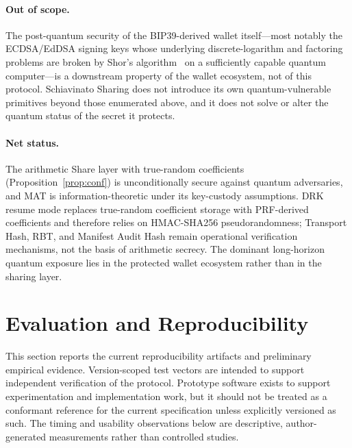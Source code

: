 \documentclass[11pt]{article}
\begin{document}
\paragraph{Out of scope.} The post-quantum security of the BIP39-derived wallet itself---most notably the ECDSA/EdDSA signing keys whose underlying discrete-logarithm and factoring problems are broken by Shor's algorithm~\cite{shor1994} on a sufficiently capable quantum computer---is a downstream property of the wallet ecosystem, not of this protocol. Schiavinato Sharing does not introduce its own quantum-vulnerable primitives beyond those enumerated above, and it does not solve or alter the quantum status of the secret it protects.

\paragraph{Net status.} The arithmetic Share layer with true-random coefficients (Proposition~\ref{prop:conf}) is unconditionally secure against quantum adversaries, and MAT is information-theoretic under its key-custody assumptions. DRK resume mode replaces true-random coefficient storage with PRF-derived coefficients and therefore relies on HMAC-SHA256 pseudorandomness; Transport Hash, RBT, and Manifest Audit Hash remain operational verification mechanisms, not the basis of arithmetic secrecy. The dominant long-horizon quantum exposure lies in the protected wallet ecosystem rather than in the sharing layer.

\section{Evaluation and Reproducibility}
\label{sec:implementation}

This section reports the current reproducibility artifacts and preliminary empirical evidence. Version-scoped test vectors are intended to support independent verification of the protocol. Prototype software exists to support experimentation and implementation work, but it should not be treated as a conformant reference for the current specification unless explicitly versioned as such. The timing and usability observations below are descriptive, author-generated measurements rather than controlled studies.
\end{document}
